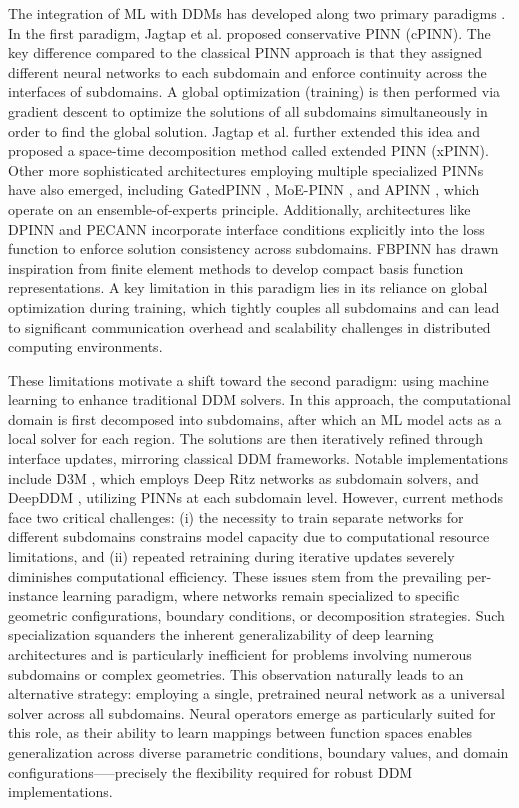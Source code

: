 \documentclass[preprint,11pt]{elsarticle}
\theoremstyle{plain}
\begin{document}
The integration of ML with DDMs has developed along two primary paradigms \cite{klawonn2024machine, heinlein2021combining}. In the first paradigm, Jagtap et al. \cite{jagtap2020conservative} proposed conservative PINN (cPINN). The key difference compared to the classical PINN approach is that they assigned different neural networks to each subdomain and enforce continuity across the interfaces of subdomains. A global optimization (training) is then performed via gradient descent to optimize the solutions of all subdomains simultaneously in order to find the global solution. Jagtap et al. further extended this idea \cite{jagtap2020extended} and proposed a space-time decomposition method called extended PINN (xPINN). Other more sophisticated architectures employing multiple specialized PINNs have also emerged, including GatedPINN \cite{stiller2020large}, MoE-PINN \cite{bischof2022mixture}, and APINN \cite{hu2023augmented}, which operate on an ensemble-of-experts principle. Additionally, architectures like DPINN \cite{dwivedi2019distributed} and PECANN \cite{basir2023generalized} incorporate interface conditions explicitly into the loss function to enforce solution consistency across subdomains. FBPINN \cite{moseley2023finite, dolean2024multilevel} has drawn inspiration from finite element methods to develop compact basis function representations. A key limitation in this paradigm lies in its reliance on global optimization during training, which tightly couples all subdomains and can lead to significant communication overhead and scalability challenges in distributed computing environments.

These limitations motivate a shift toward the second paradigm: using machine learning to enhance traditional DDM solvers. In this approach, the computational domain is first decomposed into subdomains, after which an ML model acts as a local solver for each region. The solutions are then iteratively refined through interface updates, mirroring classical DDM frameworks. Notable implementations include D3M \cite{li2019d3m}, which employs Deep Ritz networks as subdomain solvers, and DeepDDM \cite{li2020deep}, utilizing PINNs at each subdomain level. However, current methods face two critical challenges: (i) the necessity to train separate networks for different subdomains constrains model capacity due to computational resource limitations, and (ii) repeated retraining during iterative updates severely diminishes computational efficiency. These issues stem from the prevailing per-instance learning paradigm, where networks remain specialized to specific geometric configurations, boundary conditions, or decomposition strategies. Such specialization squanders the inherent generalizability of deep learning architectures and is particularly inefficient for problems involving numerous subdomains or complex geometries. This observation naturally leads to an alternative strategy: employing a single, pretrained neural network as a universal solver across all subdomains. Neural operators emerge as particularly suited for this role, as their ability to learn mappings between function spaces enables generalization across diverse parametric conditions, boundary values, and domain configurations—--precisely the flexibility required for robust DDM implementations.
\end{document}
